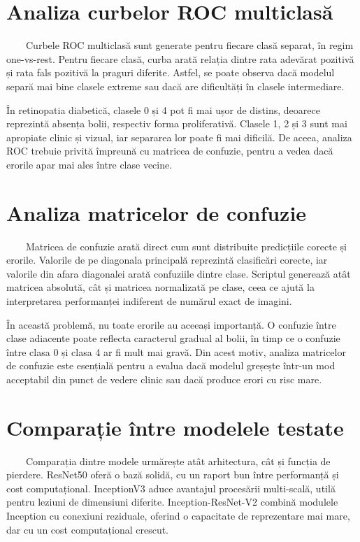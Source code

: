 \documentclass[12pt, a4paper, oneside, romanian]{teza-upb}
\begin{document}
\section{Analiza curbelor ROC multiclasă}

\ \ \ \ Curbele ROC multiclasă sunt generate pentru fiecare clasă separat, în regim one-vs-rest. Pentru fiecare clasă, curba arată relația dintre rata adevărat pozitivă și rata fals pozitivă la praguri diferite. Astfel, se poate observa dacă modelul separă mai bine clasele extreme sau dacă are dificultăți în clasele intermediare.
\bigskip

În retinopatia diabetică, clasele 0 și 4 pot fi mai ușor de distins, deoarece reprezintă absența bolii, respectiv forma proliferativă. Clasele 1, 2 și 3 sunt mai apropiate clinic și vizual, iar separarea lor poate fi mai dificilă. De aceea, analiza ROC trebuie privită împreună cu matricea de confuzie, pentru a vedea dacă erorile apar mai ales între clase vecine.

\section{Analiza matricelor de confuzie}

\ \ \ \ Matricea de confuzie arată direct cum sunt distribuite predicțiile corecte și erorile. Valorile de pe diagonala principală reprezintă clasificări corecte, iar valorile din afara diagonalei arată confuziile dintre clase. Scriptul generează atât matricea absolută, cât și matricea normalizată pe clase, ceea ce ajută la interpretarea performanței indiferent de numărul exact de imagini.
\bigskip

În această problemă, nu toate erorile au aceeași importanță. O confuzie între clase adiacente poate reflecta caracterul gradual al bolii, în timp ce o confuzie între clasa 0 și clasa 4 ar fi mult mai gravă. Din acest motiv, analiza matricelor de confuzie este esențială pentru a evalua dacă modelul greșește într-un mod acceptabil din punct de vedere clinic sau dacă produce erori cu risc mare.

\section{Comparație între modelele testate}

\ \ \ \ Comparația dintre modele urmărește atât arhitectura, cât și funcția de pierdere. ResNet50 oferă o bază solidă, cu un raport bun între performanță și cost computațional. InceptionV3 aduce avantajul procesării multi-scală, utilă pentru leziuni de dimensiuni diferite. Inception-ResNet-V2 combină modulele Inception cu conexiuni reziduale, oferind o capacitate de reprezentare mai mare, dar cu un cost computațional crescut.
\bigskip
\end{document}
